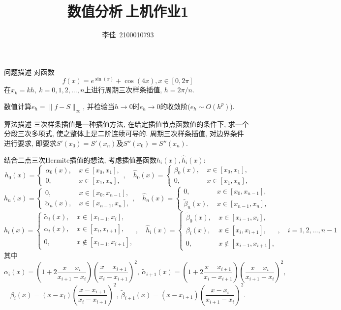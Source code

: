\documentclass{article}
\title{\textbf{数值分析$\ $上机作业1}}
\author{李佳~2100010793}
\date{}
\begin{document}
\maketitle
\begin{section}{问题描述}
对函数$$f(x) = e^{\sin(x)} + \cos(4x), x\in [0,2\pi]$$在$x_k = kh,\ k=0,1,2,...,n$上进行周期三次样条插值, 
$h = 2\pi/n$. 

数值计算$e_h = \| f-S\|_{\infty}$, 并检验当$h\to 0$时$e_h\to 0$的收敛阶($e_h\sim O(h^p)$).
\end{section}
\begin{section}{算法描述}
    三次样条插值是一种插值方法, 在给定插值节点函数值的条件下, 求一个分段三次多项式, 使之整体上是二阶连续可导的. 周期三次样条插值, 对边界条件
    进行要求, 即要求$S'(x_0)=S'(x_n)$及$S''(x_0) = S''(x_n)$. 
    
    结合二点三次Hermite插值的想法, 考虑插值基函数$h_i(x),\hat{h}_i(x)$:
    $$h_0(x) = \left\{\begin{aligned}
        \alpha_0(x),\  & x\in[x_0,x_1],\\
        0,\ & x\in[x_1,x_n],
    \end{aligned}\right.,\quad \hat{h}_0(x) = \left\{\begin{aligned}
        \beta_0(x),\  & x\in[x_0,x_1],\\
        0,\ & x\in[x_1,x_n],
    \end{aligned}\right.$$
    $$h_n(x) = \left\{\begin{aligned}
        0,\ & x\in[x_0,x_{n-1}],\\
        \tilde{\alpha}_n(x),\  & x\in[x_{n-1},x_n],
    \end{aligned}\right.,\quad \hat{h}_n(x) = \left\{\begin{aligned}
        0,\ & x\in[x_0,x_{n-1}],\\
        \tilde{\beta}_n(x),\  & x\in[x_{n-1},x_n],
    \end{aligned}\right.$$
    $$h_i(x) = \left\{\begin{aligned}
        \tilde{\alpha}_i(x),\  & x\in[x_{i-1},x_i],\\
        \alpha_i(x),\  & x\in[x_i,x_{i+1}],\\
        0,\ & x\notin[x_{i-1},x_{i+1}],
    \end{aligned}\right.,\quad \hat{h}_i(x) = \left\{\begin{aligned}
        \tilde{\beta}_0(x),\  & x\in[x_{i-1},x_i],\\
        \beta_i(x),\  & x\in[x_i,x_{i+1}],\\
        0,\ & x\notin[x_{i-1},x_{i+1}],
    \end{aligned}\right.,\quad i=1,2,...,n-1$$
    其中$$\alpha_i(x) = (1+2\frac{x-x_i}{x_{i+1}-x_i})(\frac{x-x_{i+1}}{x_i-x_{i+1}})^2,\ \tilde{\alpha}_{i+1}(x) = (1+2\frac{x-x_{i+1}}{x_{i}-x_{i+1}})(\frac{x-x_{i}}{x_{i+1}-x_{i}})^2,$$
    $$\beta_i(x) = (x-x_i)(\frac{x-x_{i+1}}{x_i-x_{i+1}})^2,\ \tilde{\beta}_{i+1}(x) = (x-x_{i+1})(\frac{x-x_{i}}{x_{i+1}-x_{i}})^2.$$


\end{section}
\end{document}
